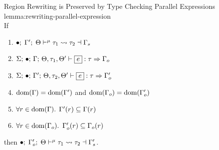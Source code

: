 \begin{oxlemma}{Region Rewriting is Preserved by Type Checking Parallel Expressions}
  {lemma:rewriting-parallel-expression} \; \\
  If
  \begin{enumerate}
  \item $\bullet; \; \Gamma^\prime; \; \Theta \vdash^{\mu} \tau_1 \leadsto \tau_2 \dashv \Gamma_s$
  \item $\oxtypjudge{\oxglobalctx}{\oxemptyctx}{\oxkontctx, \oxtype_1, \oxkontctx^\prime}{\oxvarctx}{\oxexpr}{\oxtype}{\oxvarctx_o}$
  \item $\oxtypjudge{\oxglobalctx}{\oxemptyctx}{\oxkontctx, \oxtype_2, \oxkontctx^\prime}{\oxvarctx^\prime}{\oxexpr}{\oxtype}{\oxvarctx_o^\prime}$
  \item $\textrm{dom}(\Gamma) = \textrm{dom}(\Gamma^\prime)$ and $\textrm{dom}(\Gamma_o) = \textrm{dom}(\Gamma_o^\prime)$
  \item $\forall r \in \textrm{dom}(\Gamma).$ $\Gamma^\prime(r) \subseteq \Gamma(r)$
  \item $\forall r \in \textrm{dom}(\Gamma_o).$ $\Gamma^\prime_o(r) \subseteq \Gamma_o(r)$
  \end{enumerate}
  then
  $\bullet; \; \Gamma_o^\prime; \; \Theta \vdash^{\mu} \tau_1 \leadsto \tau_2 \dashv \Gamma_s^\prime$.
\end{oxlemma}

